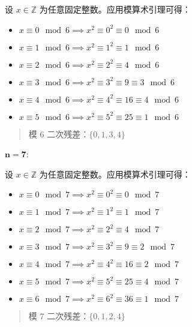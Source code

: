 \begin{example}[二次残差]
    设 $x \in \mathbb{Z}$ 为任意固定整数。应用模算术引理可得：
    \begin{itemize}
        \item $x \equiv 0 \mod 6 \implies x^2 \equiv 0^2 \equiv 0 \mod 6$
        \item $x \equiv 1 \mod 6 \implies x^2 \equiv 1^2 \equiv 1 \mod 6$
        \item $x \equiv 2 \mod 6 \implies x^2 \equiv 2^2 \equiv 4 \mod 6$
        \item $x \equiv 3 \mod 6 \implies x^2 \equiv 3^2 \equiv 9 \equiv 3 \mod 6$
        \item $x \equiv 4 \mod 6 \implies x^2 \equiv 4^2 \equiv 16 \equiv 4 \mod 6$
        \item $x \equiv 5 \mod 6 \implies x^2 \equiv 5^2 \equiv 25 \equiv 1 \mod 6$
    \end{itemize}
    \begin{quotation}
        \begin{center}
            \large 模 $6$ 二次残差：$\{0, 1, 3, 4\}$
        \end{center}
    \end{quotation}

    $\mathbf{n=7}$: 

    设 $x \in \mathbb{Z}$ 为任意固定整数。应用模算术引理可得：
    \begin{itemize}
        \item $x \equiv 0 \mod 7 \implies x^2 \equiv 0^2 \equiv 0 \mod 7$
        \item $x \equiv 1 \mod 7 \implies x^2 \equiv 1^2 \equiv 1 \mod 7$
        \item $x \equiv 2 \mod 7 \implies x^2 \equiv 2^2 \equiv 4 \mod 7$
        \item $x \equiv 3 \mod 7 \implies x^2 \equiv 3^2 \equiv 9 \equiv 2 \mod 7$
        \item $x \equiv 4 \mod 7 \implies x^2 \equiv 4^2 \equiv 16 \equiv 2 \mod 7$
        \item $x \equiv 5 \mod 7 \implies x^2 \equiv 5^2 \equiv 25 \equiv 4 \mod 7$
        \item $x \equiv 6 \mod 7 \implies x^2 \equiv 6^2 \equiv 36 \equiv 1 \mod 7$
    \end{itemize}
    \begin{quotation}
        \begin{center}
            \large 模 $7$ 二次残差：$\{0, 1, 2, 4\}$
        \end{center}
    \end{quotation}


\end{example}
